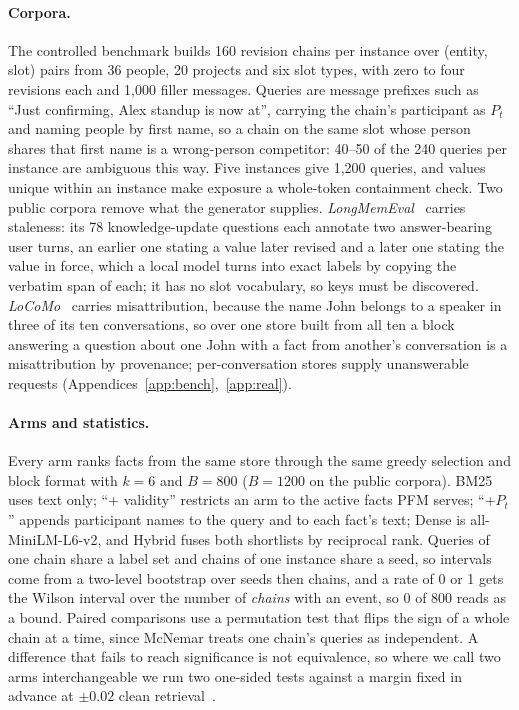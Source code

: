 \documentclass{article} %
\begin{document}
\paragraph{Corpora.} The controlled benchmark builds 160 revision chains per instance over (entity, slot) pairs from 36 people, 20 projects and six slot types, with zero to four revisions each and 1{,}000 filler messages. Queries are message prefixes such as ``Just confirming, Alex standup is now at'', carrying the chain's participant as $P_t$ and naming people by first name, so a chain on the same slot whose person shares that first name is a wrong-person competitor: 40--50 of the 240 queries per instance are ambiguous this way. Five instances give 1{,}200 queries, and values unique within an instance make exposure a whole-token containment check. Two public corpora remove what the generator supplies. \emph{LongMemEval}~\citep{wu2024longmemeval} carries staleness: its 78 knowledge-update questions each annotate two answer-bearing user turns, an earlier one stating a value later revised and a later one stating the value in force, which a local model turns into exact labels by copying the verbatim span of each; it has no slot vocabulary, so keys must be discovered. \emph{LoCoMo}~\citep{maharana2024evaluating} carries misattribution, because the name John belongs to a speaker in three of its ten conversations, so over one store built from all ten a block answering a question about one John with a fact from another's conversation is a misattribution by provenance; per-conversation stores supply unanswerable requests (Appendices~\ref{app:bench},~\ref{app:real}).

\paragraph{Arms and statistics.} Every arm ranks facts from the same store through the same greedy selection and block format with $k=6$ and $B=800$ ($B=1200$ on the public corpora). BM25 uses text only; ``+ validity'' restricts an arm to the active facts PFM serves; ``+$P_t$'' appends participant names to the query and to each fact's text; Dense is all-MiniLM-L6-v2, and Hybrid fuses both shortlists by reciprocal rank. Queries of one chain share a label set and chains of one instance share a seed, so intervals come from a two-level bootstrap over seeds then chains, and a rate of 0 or 1 gets the Wilson interval over the number of \emph{chains} with an event, so 0 of 800 reads as a bound. Paired comparisons use a permutation test that flips the sign of a whole chain at a time, since McNemar treats one chain's queries as independent. A difference that fails to reach significance is not equivalence, so where we call two arms interchangeable we run two one-sided tests against a margin fixed in advance at $\pm0.02$ clean retrieval~\citep{schuirmann1987tost}.
\end{document}
